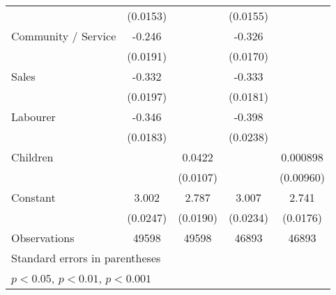 {\begin{tabular}{l*{4}{c}}
                    &    (0.0153)         &                     &    (0.0155)         &                     \\
[1em]
Community / Service &      -0.246\sym{***}&                     &      -0.326\sym{***}&                     \\
                    &    (0.0191)         &                     &    (0.0170)         &                     \\
[1em]
Sales               &      -0.332\sym{***}&                     &      -0.333\sym{***}&                     \\
                    &    (0.0197)         &                     &    (0.0181)         &                     \\
[1em]
Labourer            &      -0.346\sym{***}&                     &      -0.398\sym{***}&                     \\
                    &    (0.0183)         &                     &    (0.0238)         &                     \\
[1em]
Children            &                     &      0.0422\sym{***}&                     &    0.000898         \\
                    &                     &    (0.0107)         &                     &   (0.00960)         \\
[1em]
Constant            &       3.002\sym{***}&       2.787\sym{***}&       3.007\sym{***}&       2.741\sym{***}\\
                    &    (0.0247)         &    (0.0190)         &    (0.0234)         &    (0.0176)         \\
\hline
Observations        &       49598         &       49598         &       46893         &       46893         \\
\hline\hline
\multicolumn{5}{l}{\footnotesize Standard errors in parentheses}\\
\multicolumn{5}{l}{\footnotesize \sym{*} \(p<0.05\), \sym{**} \(p<0.01\), \sym{***} \(p<0.001\)}\\
\end{tabular}
}
